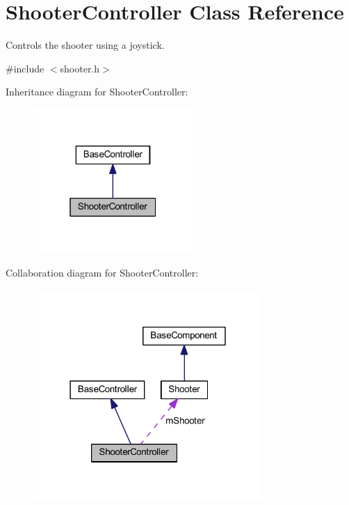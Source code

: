 \hypertarget{class_shooter_controller}{\section{\-Shooter\-Controller \-Class \-Reference}
\label{class_shooter_controller}
}


\-Controls the shooter using a joystick.  




{\ttfamily \#include $<$shooter.\-h$>$}



\-Inheritance diagram for \-Shooter\-Controller\-:\nopagebreak
\begin{figure}[H]
\begin{center}
\leavevmode
\includegraphics[width=172pt]{class_shooter_controller__inherit__graph}
\end{center}
\end{figure}


\-Collaboration diagram for \-Shooter\-Controller\-:\nopagebreak
\begin{figure}[H]
\begin{center}
\leavevmode
\includegraphics[width=247pt]{class_shooter_controller__coll__graph}
\end{center}
\end{figure}
